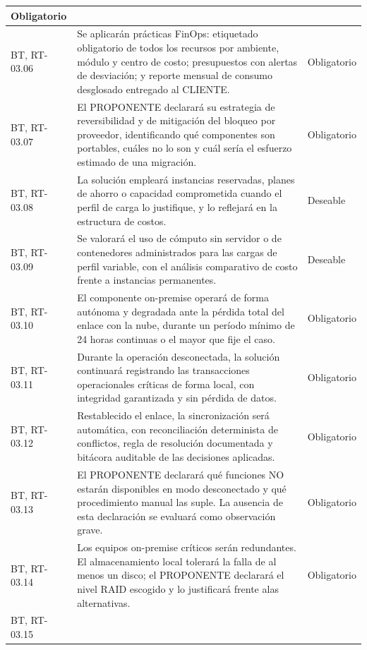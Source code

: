 \begin{longtable}{|L{0.098425\AnchoTablaAnexo}|L{0.814961\AnchoTablaAnexo}|L{0.086614\AnchoTablaAnexo}|}
Obligatorio \\ \hline
BT, RT-03.06 &
Se aplicarán prácticas FinOps: etiquetado obligatorio de todos los recursos por ambiente, módulo y centro de costo; presupuestos con alertas de desviación; y reporte mensual de consumo desglosado entregado al CLIENTE. &
Obligatorio \\ \hline
{}
BT, RT-03.07 &
El PROPONENTE declarará su estrategia de reversibilidad y de mitigación del bloqueo por proveedor, identificando qué componentes son portables, cuáles no lo son y cuál sería el esfuerzo estimado de una migración. &
Obligatorio \\ \hline
BT, RT-03.08 &
La solución empleará instancias reservadas, planes de ahorro o capacidad comprometida cuando el perfil de carga lo justifique, y lo reflejará en la estructura de costos. &
Deseable \\ \hline
{}
BT, RT-03.09 &
Se valorará el uso de cómputo sin servidor o de contenedores administrados para las cargas de perfil variable, con el análisis comparativo de costo frente a instancias permanentes. &
Deseable \\ \hline
BT, RT-03.10 &
El componente on-premise operará de forma autónoma y degradada ante la pérdida total del enlace con la nube, durante un período mínimo de 24 horas continuas o el mayor que fije el caso. &
Obligatorio \\ \hline
{}
BT, RT-03.11 &
Durante la operación desconectada, la solución continuará registrando las transacciones operacionales críticas de forma local, con integridad garantizada y sin pérdida de datos. &
Obligatorio \\ \hline
BT, RT-03.12 &
Restablecido el enlace, la sincronización será automática, con reconciliación determinista de conflictos, regla de resolución documentada y bitácora auditable de las decisiones aplicadas. &
Obligatorio \\ \hline
{}
BT, RT-03.13 &
El PROPONENTE declarará qué funciones NO estarán disponibles en modo desconectado y qué procedimiento manual las suple. La ausencia de esta declaración se evaluará como observación grave. &
Obligatorio \\ \hline
BT, RT-03.14 &
Los equipos on-premise críticos serán redundantes. El almacenamiento local tolerará la falla de al menos un disco; el PROPONENTE declarará el nivel RAID escogido y lo justificará frente alas alternativas. &
Obligatorio \\ \hline
{}
BT, RT-03.15 &

\end{longtable}
